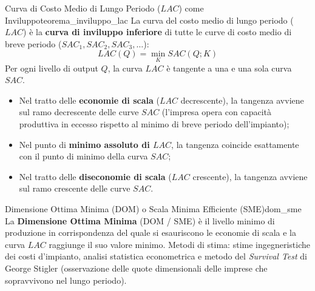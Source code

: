 \begin{teorema}{Curva di Costo Medio di Lungo Periodo ($LAC$) come Inviluppo}{teorema_inviluppo_lac}
La curva del costo medio di lungo periodo ($LAC$) è la \textbf{curva di inviluppo inferiore} di tutte le curve di costo medio di breve periodo ($SAC_1, SAC_2, SAC_3, \dots$):
\begin{equation}
    LAC(Q) = \min_{K} SAC(Q; K)
\end{equation}
Per ogni livello di output $Q$, la curva $LAC$ è tangente a una e una sola curva $SAC$.
\begin{itemize}
    \item Nel tratto delle \textbf{economie di scala} ($LAC$ decrescente), la tangenza avviene sul ramo decrescente delle curve $SAC$ (l'impresa opera con capacità produttiva in eccesso rispetto al minimo di breve periodo dell'impianto);
    \item Nel punto di \textbf{minimo assoluto di $LAC$}, la tangenza coincide esattamente con il punto di minimo della curva $SAC$;
    \item Nel tratto delle \textbf{diseconomie di scala} ($LAC$ crescente), la tangenza avviene sul ramo crescente delle curve $SAC$.
\end{itemize}
\end{teorema}

\begin{definizione}{Dimensione Ottima Minima (DOM) o Scala Minima Efficiente (SME)}{dom_sme}
La \textbf{Dimensione Ottima Minima} (DOM / SME) è il livello minimo di produzione in corrispondenza del quale si esauriscono le economie di scala e la curva $LAC$ raggiunge il suo valore minimo. Metodi di stima: stime ingegneristiche dei costi d'impianto, analisi statistica econometrica e metodo del \textit{Survival Test} di George Stigler (osservazione delle quote dimensionali delle imprese che sopravvivono nel lungo periodo).
\end{definizione}

